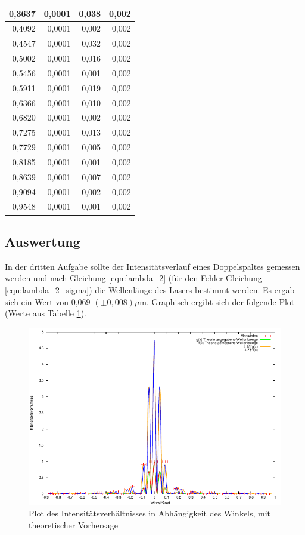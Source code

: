 \documentclass[12pt]{scrartcl}
\begin{document}
\begin{table}[H]
\begin{center}
\begin{tabular}{|r|r|r|r|}
0,3637 & 0,0001 & 0,038 & 0,002 \\ \hline
0,4092 & 0,0001 & 0,002 & 0,002 \\ \hline
0,4547 & 0,0001 & 0,032 & 0,002 \\ \hline
0,5002 & 0,0001 & 0,016 & 0,002 \\ \hline
0,5456 & 0,0001 & 0,001 & 0,002 \\ \hline
0,5911 & 0,0001 & 0,019 & 0,002 \\ \hline
0,6366 & 0,0001 & 0,010 & 0,002 \\ \hline
0,6820 & 0,0001 & 0,002 & 0,002 \\ \hline
0,7275 & 0,0001 & 0,013 & 0,002 \\ \hline
0,7729 & 0,0001 & 0,005 & 0,002 \\ \hline
0,8185 & 0,0001 & 0,001 & 0,002 \\ \hline
0,8639 & 0,0001 & 0,007 & 0,002 \\ \hline
0,9094 & 0,0001 & 0,002 & 0,002 \\ \hline
0,9548 & 0,0001 & 0,001 & 0,002 \\ \hline
\end{tabular}
\end{center}
\label{tab:a_3_m}
\end{table}


\subsection{Auswertung}
In der dritten Aufgabe sollte der Intensitätsverlauf eines Doppelspaltes gemessen werden und nach Gleichung \ref{eqn:lambda_2} (für den Fehler Gleichung \ref{eqn:lambda_2_sigma}) die Wellenlänge des Lasers bestimmt werden. Es ergab sich ein Wert von 0,069 $(\pm 0,008) \mu$m.
Graphisch ergibt sich der folgende Plot (Werte aus Tabelle \ref{tab:a_3_m}).

\begin{figure}[H]
\centering
    \includegraphics[scale = 1]{a_3.pdf}
  	\caption[Plot des Intensitätsverhältnisses in Abhängigkeit des Winkels, mit theoretischer Vorhersage]{Plot des Intensitätsverhältnisses in Abhängigkeit des Winkels, mit theoretischer Vorhersage}
  \label{fig:a_3}
\end{figure}
\end{document}
